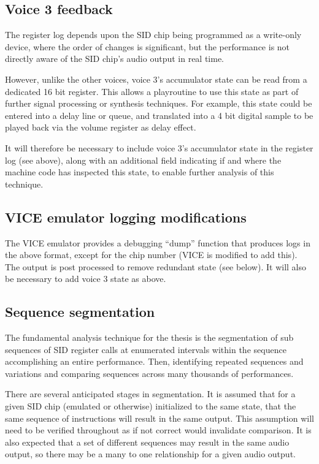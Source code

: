 \documentclass[10pt]{article}
\begin{document}
\begin{multicols*}{2}
\subsection{Voice 3 feedback}

The register log depends upon the SID chip being programmed as a write-only device, where the order of changes is significant, but the performance is not directly aware of the SID chip’s audio output in real time.

However, unlike the other voices, voice 3’s accumulator state can be read from a dedicated 16 bit register. This allows a playroutine to use this state as part of further signal processing or synthesis techniques. For example, this state could be entered into a delay line or queue, and translated into a 4 bit digital sample to be played back via the volume register as delay effect.

It will therefore be necessary to include voice 3’s accumulator state in the register log (see above), along with an additional field indicating if and where the machine code has inspected this state, to enable further analysis of this technique.

\subsection{VICE emulator logging modifications}

The VICE emulator provides a debugging “dump” function that produces logs in the above format, except for the chip number (VICE is modified to add this). The output is post processed to remove redundant state (see below). It will also be necessary to add voice 3 state as above.

\subsection{Sequence segmentation}

The fundamental analysis technique for the thesis is the segmentation of sub sequences of SID register calls at enumerated intervals within the sequence accomplishing an entire performance. Then, identifying repeated sequences and variations and comparing sequences across many thousands of performances.

There are several anticipated stages in segmentation. It is assumed that for a given SID chip (emulated or otherwise) initialized to the same state, that the same sequence of instructions will result in the same output. This assumption will need to be verified throughout as if not correct would invalidate comparison. It is also expected that a set of different sequences may result in the same audio output, so there may be a many to one relationship for a given audio output.


\end{multicols*}
\end{document}
